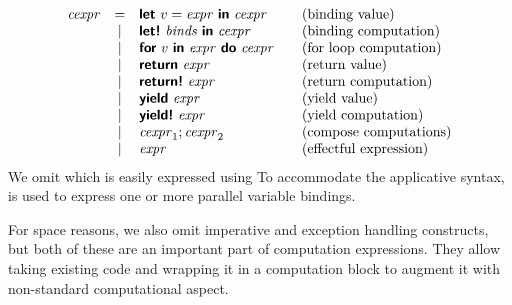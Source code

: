 \documentclass[runningheads,a4paper]{llncs}
\begin{document}
\begin{equation*}
\begin{array}{lclcl}
\cexpr &=& \kvd{let}~v=\expr~\kvd{in}~\cexpr                &&\textnormal{(binding value)} \\
       &|& \kvd{let!}~\binds~\kvd{in}~\cexpr                &&\textnormal{(binding computation)} \\
       &|& \kvd{for}~v~\kvd{in}~\expr~\kvd{do}~\cexpr       &&\textnormal{(for loop computation)} \\
       &|& \kvd{return}~\expr                               &&\textnormal{(return value)} \\
       &|& \kvd{return!}~\expr                              &&\textnormal{(return computation)} \\
       &|& \kvd{yield}~\expr                                &&\textnormal{(yield value)} \\
       &|& \kvd{yield!}~\expr                               &&\textnormal{(yield computation)} \\
       &|& \cexpr_1; \cexpr_2                               &&\textnormal{(compose computations)} \\       
       &|& \expr                                            &&\textnormal{(effectful expression)} \\
\end{array}
\end{equation*}
%
We omit  which is easily expressed using  To accommodate the applicative 
syntax, \binds\; is used to express one or more parallel variable bindings. 

For space reasons, we also omit imperative  and exception handling 
constructs, but both of these are an important part of computation expressions. They allow
taking existing code and wrapping it in a computation block to augment it with non-standard
computational aspect.

\end{document}
